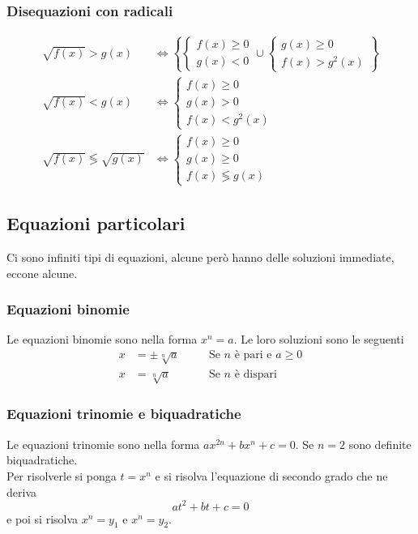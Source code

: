 \subsubsection{Disequazioni con radicali}
\begin{align*}
\sqrt{f(x)} > g(x) &\Leftrightarrow \left\{\begin{cases}
f(x) \geq 0\\
g(x) < 0
\end{cases} \cup \begin{cases}
g(x) \geq 0\\
f(x) > g^2(x)
\end{cases}\right\}\\
\sqrt{f(x)} < g(x) &\Leftrightarrow \begin{cases}
f(x) \geq 0\\
g(x) > 0\\
f(x) < g^2(x)
\end{cases}\\
\sqrt{f(x)} \lessgtr \sqrt{g(x)} &\Leftrightarrow \begin{cases}
f(x) \geq 0\\
g(x) \geq 0\\
f(x) \lessgtr g(x)
\end{cases}
\end{align*}

\subsection{Equazioni particolari}
Ci sono infiniti tipi di equazioni, alcune però hanno delle soluzioni immediate, eccone alcune.

\subsubsection{Equazioni binomie}
Le equazioni binomie sono nella forma $x^n = a$. Le loro soluzioni sono le seguenti
\begin{align*}
x &= \pm\sqrt[n]{a} &\quad &\text{Se $n$ è pari e $a\geq0$}\\
x &= \sqrt[n]{a} &\quad &\text{Se $n$ è dispari}
\end{align*}

\subsubsection{Equazioni trinomie e biquadratiche}
Le equazioni trinomie sono nella forma $ax^{2n} + bx^n + c =0$. Se $n=2$ sono definite biquadratiche.\\
Per risolverle si ponga $t = x^n$ e si risolva l'equazione di secondo grado che ne deriva
\begin{equation*}
at^2 + bt + c = 0
\end{equation*}
e poi si risolva $x^n = y_1$ e $x^n = y_2$.

